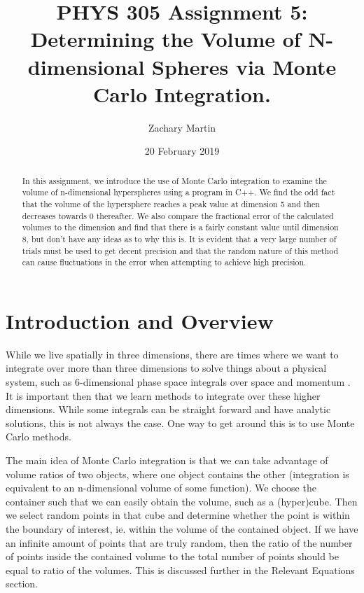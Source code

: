 \documentclass[aps,prl,twocolumn,superscriptaddress]{revtex4-1}
\begin{document}
\title{PHYS 305 Assignment 5: Determining the Volume of N-dimensional Spheres via Monte Carlo Integration.}
\author{Zachary Martin}
\date{20 February 2019}

\begin{abstract}
In this assignment, we introduce the use of Monte Carlo integration to examine the volume of n-dimensional hyperspheres using a program in C++. We find the odd fact that the volume of the hypersphere reaches a peak value at dimension 5 and then decreases towards 0 thereafter. We also compare the fractional error of the calculated volumes to the dimension and find that there is a fairly constant value until dimension 8, but don't have any ideas as to why this is. It is evident that a very large number of trials must be used to get decent precision and that the random nature of this method can cause fluctuations in the error when attempting to achieve high precision. 
\end{abstract}

\maketitle

\section{Introduction and Overview}

While we live spatially in three dimensions, there are times where we want to integrate over more than three dimensions to solve things about a physical system, such as 6-dimensional phase space integrals over space and momentum \citep{Laulima}. It is important then that we learn methods to integrate over these higher dimensions. While some integrals can be straight forward and have analytic solutions, this is not always the case. One way to get around this is to use Monte Carlo methods. 

The main idea of Monte Carlo integration is that we can take advantage of volume ratios of two objects, where one object contains the other (integration is equivalent to an n-dimensional volume of some function). We choose the container such that we can easily obtain the volume, such as a (hyper)cube. Then we select random points in that cube and determine whether the point is within the boundary of interest, ie. within the volume of the contained object. If we have an infinite amount of points that are truly random, then the ratio of the number of points inside the contained volume to the total number of points should be equal to ratio of the volumes. This is discussed further in the Relevant Equations section.
\end{document}
